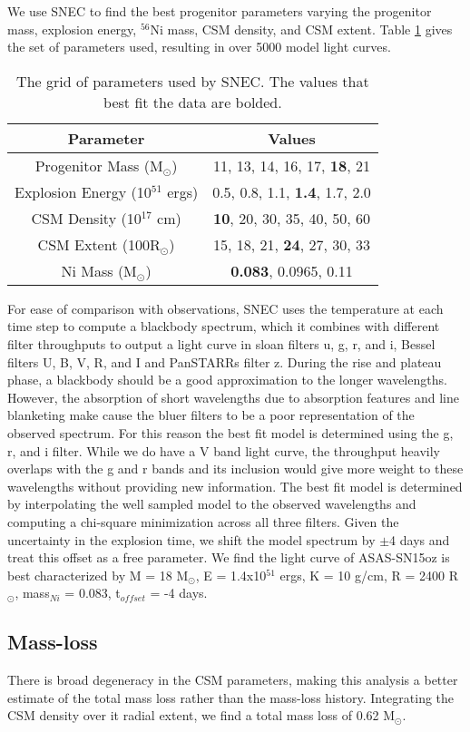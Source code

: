 \documentclass[preprint]{aastex61}
\newcommand{\msunperiod}{M$_{\odot}$}
\newcommand{\rsun}{R$_{\odot}$}
\begin{document}
We use SNEC to find the best progenitor parameters varying the progenitor mass, explosion energy, ${}^{56}$Ni mass, CSM density, and CSM extent. 
Table \ref{tb:param} gives the set of parameters used, resulting in over 5000 model light curves.
\begin{table}
\centering
\caption{The grid of parameters used by SNEC. 
The values that best fit the data are bolded.}
\label{tb:param}
\begin{tabular}{c|c}
Parameter & Values \\
\hline
Progenitor Mass (\msunperiod) & 11, 13, 14, 16, 17, {\bf 18}, 21 \\
Explosion Energy (10$^{51}$ ergs) & 0.5, 0.8, 1.1, {\bf 1.4}, 1.7, 2.0 \\
CSM Density (10$^{17}$ cm) & {\bf 10}, 20, 30, 35, 40, 50, 60 \\
CSM Extent (100R$_{\odot}$) & 15, 18, 21, {\bf 24}, 27, 30, 33 \\
Ni Mass (\msunperiod) & {\bf 0.083}, 0.0965, 0.11 \\

\end{tabular}
\end{table}

For ease of comparison with observations, SNEC uses the temperature at each time step to compute a blackbody spectrum, which it combines with different filter throughputs to output a light curve in sloan filters u, g, r, and i, Bessel filters U, B, V, R, and I and PanSTARRs filter z. 
During the rise and plateau phase, a blackbody should be a good approximation to the longer wavelengths. 
However, the absorption of short wavelengths due to absorption features and line blanketing make cause the bluer filters to be a poor representation of the observed spectrum.
For this reason the best fit model is determined using the g, r, and i filter. 
While we do have a V band light curve, the throughput heavily overlaps with the g and r bands and its inclusion would give more weight to these wavelengths without providing new information.
The best fit model is determined by interpolating the well sampled model to the observed wavelengths and computing a chi-square minimization across all three filters.
Given the uncertainty in the explosion time, we shift the model spectrum by $\pm$4 days and treat this offset as a free parameter.
We find the light curve of ASAS-SN15oz is best characterized by M = 18 \msunperiod, E = 1.4x10$^{51}$ ergs, K = 10 g/cm, R = 2400 \rsun, mass$_{Ni}$ = 0.083, t$_{offset}$ = -4 days. 
\subsection{Mass-loss}
There is broad degeneracy in the CSM parameters, making this analysis a better estimate of the total mass loss rather than the mass-loss history. 
Integrating the CSM density over it radial extent, we find a total mass loss of 0.62 \msunperiod. 
\end{document}

